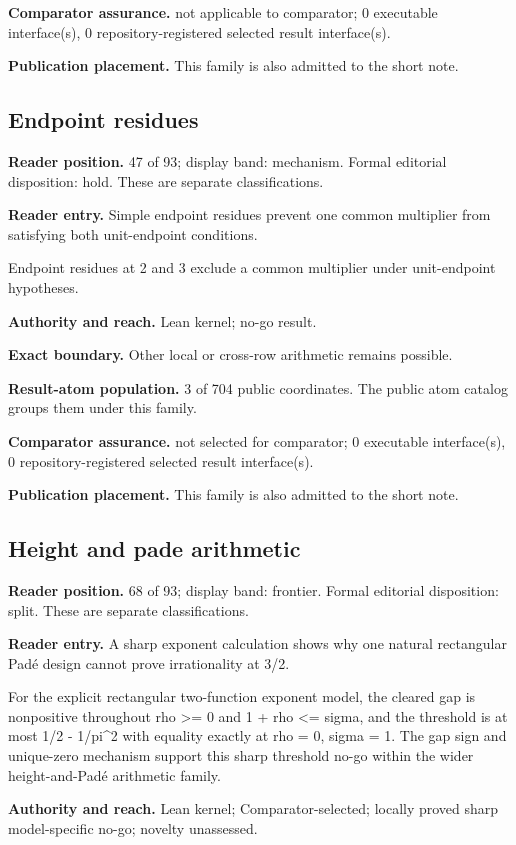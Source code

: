 \documentclass[11pt]{article}
\begin{document}
\textbf{Comparator assurance.} not applicable to comparator; 0 executable interface(s), 0 repository-registered selected result interface(s).

\textbf{Publication placement.} This family is also admitted to the short note.

\subsection{Endpoint residues}
\textbf{Reader position.} 47 of 93; display band: mechanism.  Formal editorial disposition: hold.  These are separate classifications.

\textbf{Reader entry.} Simple endpoint residues prevent one common multiplier from satisfying both unit-endpoint conditions.

Endpoint residues at 2 and 3 exclude a common multiplier under unit-endpoint hypotheses.

\textbf{Authority and reach.} Lean kernel; no-go result.

\textbf{Exact boundary.} Other local or cross-row arithmetic remains possible.

\textbf{Result-atom population.} 3 of 704 public coordinates. The public atom catalog groups them under this family.

\textbf{Comparator assurance.} not selected for comparator; 0 executable interface(s), 0 repository-registered selected result interface(s).

\textbf{Publication placement.} This family is also admitted to the short note.

\subsection{Height and pade arithmetic}
\textbf{Reader position.} 68 of 93; display band: frontier.  Formal editorial disposition: split.  These are separate classifications.

\textbf{Reader entry.} A sharp exponent calculation shows why one natural rectangular Padé design cannot prove irrationality at 3/2.

For the explicit rectangular two-function exponent model, the cleared gap is nonpositive throughout rho >= 0 and 1 + rho <= sigma, and the threshold is at most 1/2 - 1/pi\textasciicircum{}2 with equality exactly at rho = 0, sigma = 1. The gap sign and unique-zero mechanism support this sharp threshold no-go within the wider height-and-Padé arithmetic family.

\textbf{Authority and reach.} Lean kernel; Comparator-selected; locally proved sharp model-specific no-go; novelty unassessed.
\end{document}
